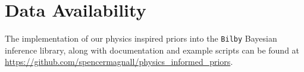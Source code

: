\documentclass[twocolumn]{aastex631}
\begin{document}
\section*{Data Availability}

The implementation of our physics inspired priors into the \texttt{Bilby}
Bayesian inference library, along with documentation and example scripts
can be found at
\url{https://github.com/spencermagnall/physics\_informed\_priors}.

{}

	
	
\end{document}
